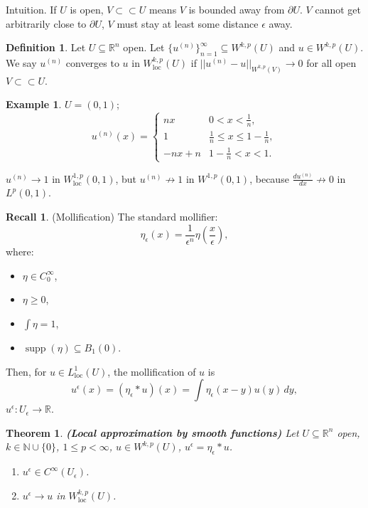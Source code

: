\documentclass[12pt]{article}
\DeclareMathOperator{\supp}{supp}
\newtheorem{theorem}{Theorem}[section]
\theoremstyle{definition}
\newtheorem*{definition*}{Definition}
\newtheorem*{recall}{Recall}
\newtheorem*{example*}{Example}
\begin{document}
Intuition. If $U$ is open, $V\subset\subset U$ means $V$ is bounded away from $\partial U$. $V$ cannot get arbitrarily close to $\partial U$, $V$ must stay at least some distance $\epsilon$ away.

\begin{definition*}
Let $U\subseteq\mathbb R^n$ open. Let $\{u^{(n)}\}_{n=1}^\infty\subseteq W^{k,p}(U)$ and $u\in W^{k,p}(U)$. We say $u^{(n)}$ converges to $u$ in $W_\text{loc}^{k,p}(U)$ if $||u^{(n)}-u||_{W^{k,p}(V)}\rightarrow0$ for all open $V\subset\subset U$.
\end{definition*}

\begin{example*}
$U=(0,1)$;
\[u^{(n)}(x)=\left\{\begin{array}{ll}nx&0<x<\frac1n,\\1&\frac1n\leq x\leq1-\frac1n,\\-nx+n&1-\frac1n<x<1.\end{array}\right.\]

$u^{(n)}\rightarrow1$ in $W_\text{loc}^{1,p}(0,1)$, but $u^{(n)}\not\rightarrow1$ in $W^{1,p}(0,1)$, because $\frac{du^{(n)}}{dx}\not\rightarrow0$ in $L^p(0,1)$.
\end{example*}

\begin{recall}
(Mollification) The standard mollifier:
\[\eta_\epsilon(x)=\frac1{\epsilon^n}\eta\left(\frac x\epsilon\right),\]
where:
\begin{itemize}
\item $\eta\in C_0^\infty$,
\item $\eta\geq0$,
\item $\int\eta=1$,
\item $\supp(\eta)\subseteq B_1(0)$.
\end{itemize}

Then, for $u\in L_\text{loc}^1(U)$, the mollification of $u$ is
\[u^\epsilon(x)=(\eta_\epsilon*u)(x)=\int\eta_\epsilon(x-y)u(y)\,dy,\]
$u^\epsilon:U_\epsilon\rightarrow\mathbb R$.
\end{recall}

\begin{theorem}\label{local_approx_smooth}
\emph{\textbf{(Local approximation by smooth functions)}} Let $U\subseteq\mathbb R^n$ open, $k\in\mathbb N\cup\{0\}$, $1\leq p<\infty$, $u\in W^{k,p}(U)$, $u^\epsilon=\eta_\epsilon*u$.

\begin{enumerate}[label=(\roman*)]
\item $u^\epsilon\in C^\infty(U_\epsilon)$.

\item\label{conv_Sobolev_loc} $u^\epsilon\rightarrow u$ in $W_\text{loc}^{k,p}(U)$.
\end{enumerate}
\end{theorem}
\end{document}
